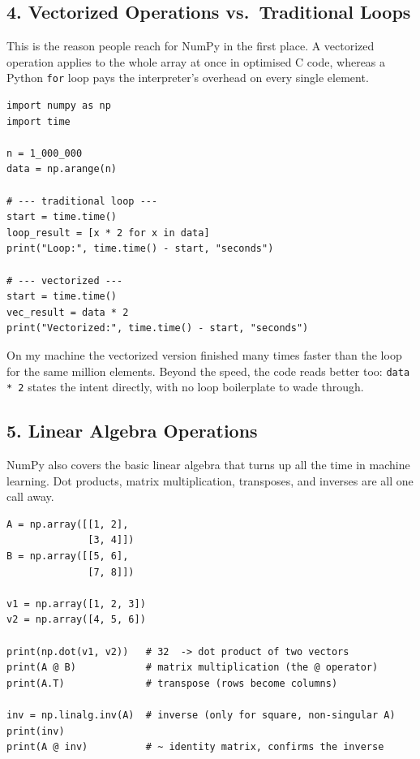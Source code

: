 \documentclass[11pt,a4paper]{article}
\begin{document}
\subsection*{4. Vectorized Operations vs.\ Traditional Loops}
This is the reason people reach for NumPy in the first place. A vectorized operation applies to the whole array at once in optimised C code, whereas a Python \texttt{for} loop pays the interpreter's overhead on every single element.

\begin{lstlisting}[style=py, caption={Timing a vectorized operation against a plain loop.}]
import numpy as np
import time

n = 1_000_000
data = np.arange(n)

# --- traditional loop ---
start = time.time()
loop_result = [x * 2 for x in data]
print("Loop:", time.time() - start, "seconds")

# --- vectorized ---
start = time.time()
vec_result = data * 2
print("Vectorized:", time.time() - start, "seconds")
\end{lstlisting}

On my machine the vectorized version finished many times faster than the loop for the same million elements. Beyond the speed, the code reads better too: \texttt{data * 2} states the intent directly, with no loop boilerplate to wade through.

\subsection*{5. Linear Algebra Operations}
NumPy also covers the basic linear algebra that turns up all the time in machine learning. Dot products, matrix multiplication, transposes, and inverses are all one call away.

\begin{lstlisting}[style=py, caption={Dot product, matrix multiply, transpose, and inverse.}]
A = np.array([[1, 2],
              [3, 4]])
B = np.array([[5, 6],
              [7, 8]])

v1 = np.array([1, 2, 3])
v2 = np.array([4, 5, 6])

print(np.dot(v1, v2))   # 32  -> dot product of two vectors
print(A @ B)            # matrix multiplication (the @ operator)
print(A.T)              # transpose (rows become columns)

inv = np.linalg.inv(A)  # inverse (only for square, non-singular A)
print(inv)
print(A @ inv)          # ~ identity matrix, confirms the inverse
\end{lstlisting}
\end{document}
